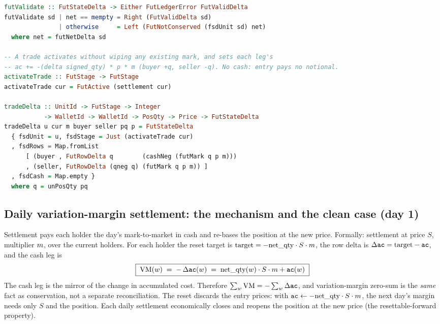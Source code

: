 \begin{lstlisting}[language=Haskell]
futValidate :: FutStateDelta -> Either FutLedgerError FutValidDelta
futValidate sd | net == mempty = Right (FutValidDelta sd)
               | otherwise     = Left (FutNotConserved (fsdUnit sd) net)
  where net = futNetDelta sd

-- A trade activates without wiping any existing mark, and sets each leg's
-- ac += -(delta signed_qty) * p * m (buyer +q, seller -q). No cash: entry pays no notional.
activateTrade :: FutStage -> FutStage
activateTrade cur = FutActive (settlement cur)

tradeDelta :: UnitId -> FutStage -> Integer
           -> WalletId -> WalletId -> PosQty -> Price -> FutStateDelta
tradeDelta u cur m buyer seller pq p = FutStateDelta
  { fsdUnit = u, fsdStage = Just (activateTrade cur)
  , fsdRows = Map.fromList
      [ (buyer , FutRowDelta q        (cashNeg (futMark q p m)))
      , (seller, FutRowDelta (qneg q) (futMark q p m)) ]
  , fsdCash = Map.empty }
  where q = unPosQty pq
\end{lstlisting}

\subsection{Daily variation-margin settlement: the mechanism and the clean case (day 1)}
\label{sec:settle-mech}

Settlement pays each holder the day's mark-to-market in cash and re-bases the position at the new
price. Formally: settlement at price $S$, multiplier $m$, over the current holders. For each
holder the reset target is $\mathrm{target}=-\mathrm{net\_qty}\cdot S\cdot m$, the row delta is
$\Delta\texttt{ac}=\mathrm{target}-\texttt{ac}$, and the cash leg is
\[
\boxed{\;\mathrm{VM}(w) \;=\; -\,\Delta\texttt{ac}(w) \;=\; \mathrm{net\_qty}(w)\cdot S\cdot m + \texttt{ac}(w)\;}
\]
The cash leg is the mirror of the change in accumulated cost. Therefore
$\sum_w\mathrm{VM} = -\sum_w\Delta\texttt{ac}$, and variation-margin zero-sum is the \emph{same} fact as \ac{}
conservation, not a separate reconciliation. The reset discards the entry prices: with
$\texttt{ac}\leftarrow-\mathrm{net\_qty}\cdot S\cdot m$, the next day's margin needs only $S$ and the position. Each
daily settlement economically closes and reopens the position at the new price (the resettable-forward
property).

